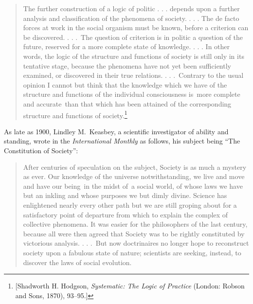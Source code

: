 \documentclass[twoside,symmetric,nobib,justified]{tufte-book}
\begin{document}
\begin{quote}
The further construction of a logic of politic . . . depends upon a
further analysis and classification of the phenomena of society. . . .
The de facto forces at work in the social organism must be known, before
a criterion can be discovered. . . .~The question of criterion is in
politic a question of the future, reserved for a more complete state of
knowledge. . . . In other words, the logic of the structure and
functions of society is still only in its tentative stage, because the
phenomena have not yet been sufficiently examined, or discovered in
their true relations. . . .~Contrary to the usual opinion I cannot but
think that the knowledge which we have of the structure and functions of
the individual consciousness is~more complete and accurate~than that
which has been attained of the corresponding structure and functions of
society.\footnote{{[}Shadworth H. Hodgson, \emph{Systematic: The Logic
  of Practice} (London: Robson and Sons, 1870), 93--95.{]}} ~
\end{quote}

As late as 1900, Lindley M.~Keasbey, a scientific investigator of
ability and standing, wrote in the \emph{International Monthly} as
follows, his subject being ``The Constitution of Society'':~

\begin{quote}
After centuries of speculation on the subject, Society is as much a
mystery as ever. Our knowledge of the universe notwithstanding, we live
and move and have our being~in the midst of~a social world, of whose
laws we have but an inkling and whose purposes we but dimly divine.
Science has enlightened nearly every other path but we are still groping
about for a satisfactory point of departure from which to explain the
complex of collective phenomena. It was easier for the philosophers of
the last century, because all were then agreed that Society was to be
rightly constituted by victorious analysis. . . .~But now doctrinaires
no longer hope to reconstruct society upon a fabulous state of nature;
scientists are seeking, instead, to discover the laws of social
evolution.~
\end{quote}
\end{document}
